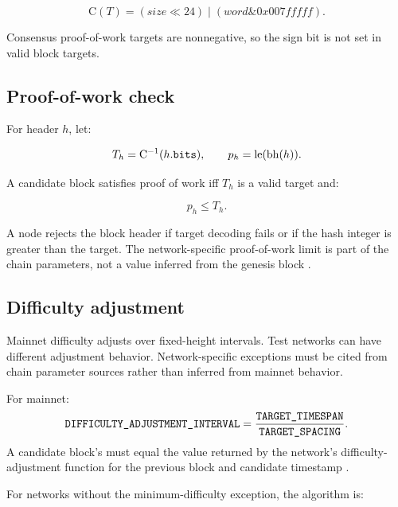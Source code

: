 \[
  \mathrm{C}(T) = (size \ll 24) \mathbin{|} (word \mathbin{\&} 0x007fffff).
\]

Consensus proof-of-work targets are nonnegative, so the sign bit is not set in
valid block targets.

\subsection{Proof-of-work check}

For header \(h\), let:

\[
  T_h = \mathrm{C}^{-1}(h.\text{\texttt{bits}}),\qquad p_h = \mathrm{le}(\mathrm{bh}(h)).
\]

A candidate block satisfies proof of work iff \(T_h\) is a valid target and:

\[
  p_h \le T_h.
\]

A node rejects the block header if target decoding fails or if the hash integer
is greater than the target. The network-specific proof-of-work limit is part of
the chain parameters, not a value inferred from the genesis block
\cite{bitcoin-core-v31}.

\subsection{Difficulty adjustment}

Mainnet difficulty adjusts over fixed-height intervals. Test networks can have
different adjustment behavior. Network-specific exceptions must be cited from
chain parameter sources rather than inferred from mainnet behavior.

For mainnet:
\[
  \text{\texttt{DIFFICULTY\_ADJUSTMENT\_INTERVAL}} =
  \frac{\text{\texttt{TARGET\_TIMESPAN}}}{\text{\texttt{TARGET\_SPACING}}}.
\]
A candidate block's  must equal the value returned by the network's
difficulty-adjustment function for the previous block and candidate timestamp
\cite{bitcoin-core-v31}.

For networks without the minimum-difficulty exception, the algorithm is:

